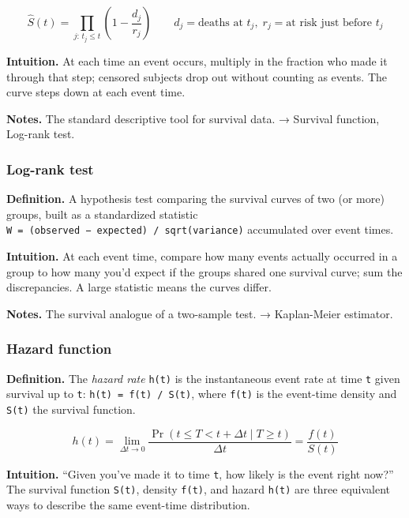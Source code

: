 \documentclass[
  10pt,
  letterpaper,
  onecolumn]{article}
\begin{document}
\begin{equation*}
\hat S(t)=\prod_{j:\,t_j\le t}\left(1-\frac{d_j}{r_j}\right)
\qquad d_j=\text{deaths at }t_j,\; r_j=\text{at risk just before }t_j
\end{equation*}

\textbf{Intuition.} At each time an event occurs, multiply in the
fraction who made it through that step; censored subjects drop out
without counting as events. The curve steps down at each event time.

\textbf{Notes.} The standard descriptive tool for survival data. →
Survival function, Log-rank test.

\hypertarget{log-rank-test}{%
\subsubsection{Log-rank test}\label{log-rank-test}}

\textbf{Definition.} A hypothesis test comparing the survival curves of
two (or more) groups, built as a standardized statistic
\texttt{W\ =\ (observed\ −\ expected)\ /\ sqrt(variance)} accumulated
over event times.

\textbf{Intuition.} At each event time, compare how many events actually
occurred in a group to how many you'd expect if the groups shared one
survival curve; sum the discrepancies. A large statistic means the
curves differ.

\textbf{Notes.} The survival analogue of a two-sample test. →
Kaplan-Meier estimator.

\hypertarget{hazard-function}{%
\subsubsection{Hazard function}\label{hazard-function}}

\textbf{Definition.} The \emph{hazard rate} \texttt{h(t)} is the
instantaneous event rate at time \texttt{t} given survival up to
\texttt{t}: \texttt{h(t)\ =\ f(t)\ /\ S(t)}, where \texttt{f(t)} is the
event-time density and \texttt{S(t)} the survival function.

\begin{equation*}
h(t)=\lim_{\Delta t\to 0}\frac{\Pr(t\le T<t+\Delta t\mid T\ge t)}{\Delta t}
=\frac{f(t)}{S(t)}
\end{equation*}

\textbf{Intuition.} ``Given you've made it to time \texttt{t}, how
likely is the event right now?'' The survival function \texttt{S(t)},
density \texttt{f(t)}, and hazard \texttt{h(t)} are three equivalent
ways to describe the same event-time distribution.
\end{document}
